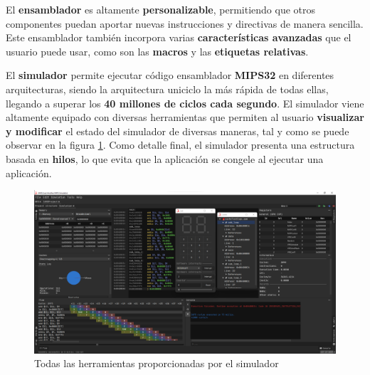 El \textbf{ensamblador} es altamente \textbf{personalizable},
permitiendo que otros componentes puedan aportar nuevas instrucciones y
directivas de manera sencilla.
Este ensamblador también incorpora varias \textbf{características avanzadas}
que el usuario puede usar, como son las \textbf{macros} y las
\textbf{etiquetas relativas}.

El \textbf{simulador} permite ejecutar código ensamblador
\textbf{MIPS32} en diferentes arquitecturas, siendo la arquitectura
uniciclo la más rápida de todas ellas, llegando a superar los
\textbf{40 millones de ciclos cada segundo}.
El simulador viene altamente equipado con diversas herramientas que
permiten al usuario \textbf{visualizar y modificar} el estado del simulador
de diversas maneras, tal y como se puede observar en la figura \ref{fig:mips-tools}.
Como detalle final, el simulador presenta una estructura basada en
\textbf{hilos}, lo que evita que la aplicación se congele al ejecutar
una aplicación.

\begin{figure}[h]
    \centering
    \includegraphics[width=\textwidth]{images/result/mips-tools}
    \caption{Todas las herramientas proporcionadas por el simulador}
    \label{fig:mips-tools}
\end{figure}